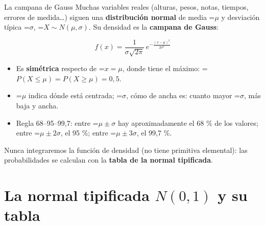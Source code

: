 \documentclass[11pt,a4paper]{article}
\newcommand{\fmm}[1]{\setbox0=\hbox{$#1$}\ifdim\wd0>\linewidth\[#1\]\else\mbox{\box0}\fi}
\begin{document}
  

  
\begin{fmdef}{La campana de Gauss}
Muchas variables reales (alturas, pesos, notas, tiempos, errores de medida\dots{}) siguen una \textbf{distribución normal} de media \fmm{\mu} y desviación típica \fmm{\sigma}, \fmm{X\sim N(\mu,\sigma)}. Su densidad es la \textbf{campana de Gauss}:

      
\[f(x)=\frac{1}{\sigma\sqrt{2\pi}}\,e^{-\frac{(x-\mu)^2}{2\sigma^2}}\]

      
\begin{itemize}
\item Es \textbf{simétrica} respecto de \fmm{x=\mu}, donde tiene el máximo: \fmm{P(X\leq\mu)=P(X\geq\mu)=0{,}5}.
\item \fmm{\mu} indica dónde está centrada; \fmm{\sigma}, cómo de ancha es: cuanto mayor \fmm{\sigma}, más baja y ancha.
\item Regla 68--95--99,7: entre \fmm{\mu\pm\sigma} hay aproximadamente el 68 \% de los valores; entre \fmm{\mu\pm2\sigma}, el 95 \%; entre \fmm{\mu\pm3\sigma}, el 99,7 \%.
\end{itemize}

      
\begin{fmnote}Nunca integraremos la función de densidad (no tiene primitiva elemental): las probabilidades se calculan con la \textbf{tabla de la normal tipificada}.\end{fmnote}
\end{fmdef}

\section{La normal tipificada $N(0,1)$ y su tabla}\hypertarget{sec6}{}

  
\end{document}
